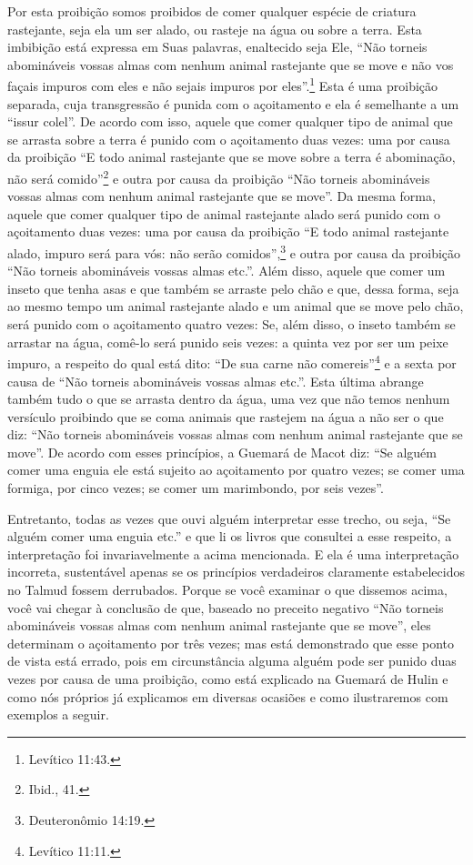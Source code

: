 Por esta proibição somos proibidos de comer qualquer espécie de
criatura rastejante, seja ela um ser alado, ou rasteje na água ou sobre
a terra.
Esta imbibição está expressa em Suas palavras, enaltecido seja Ele,
``Não torneis abomináveis vossas almas com nenhum animal rastejante que se move e
não vos façais impuros com eles e não sejais impuros por eles''.\footnote{Levítico
11:43.} Esta é uma proibição separada, cuja transgressão é punida com o
açoitamento e ela é semelhante a um ``issur colel''. De acordo com isso,
aquele que comer qualquer tipo de animal que se arrasta sobre a terra é punido com
o açoitamento duas vezes: uma por causa da proibição ``E todo animal
rastejante que se move sobre a terra é abominação, não será comido''\footnote{Ibid., 41.} e
outra por causa da proibição ``Não torneis abomináveis vossas almas com
nenhum animal rastejante que se move''. Da mesma forma, aquele que comer
qualquer tipo de animal rastejante alado será punido com o açoitamento duas
vezes: uma por causa da proibição ``E todo animal rastejante alado, impuro será
para vós: não serão comidos'',\footnote{Deuteronômio 14:19.} e outra por causa da proibição
``Não torneis abomináveis vossas almas etc.''. Além disso, aquele que comer um
inseto que tenha asas e que também se arraste pelo chão e que, dessa
forma, seja ao mesmo tempo um animal rastejante alado e um animal que se move pelo
chão, será punido com o açoitamento quatro vezes: Se, além disso, o
inseto também se arrastar na água, comê-lo será punido seis vezes: a quinta vez
por ser um peixe impuro, a respeito do qual está dito: ``De sua carne
não comereis''\footnote{Levítico 11:11.} e a sexta por causa de ``Não torneis
abomináveis vossas almas etc.''. Esta última abrange também tudo o que
se arrasta dentro da água, uma vez que não temos nenhum versículo
proibindo que se coma animais que rastejem na água a não ser o que diz:
``Não torneis abomináveis vossas almas com nenhum animal rastejante que
se move''. De acordo com esses princípios, a Guemará de Macot diz: ``Se
alguém comer uma enguia ele está sujeito ao açoitamento por quatro
vezes; se comer uma formiga, por cinco vezes; se comer um marimbondo,
por seis vezes''.

Entretanto, todas as vezes que ouvi alguém interpretar esse trecho, ou
seja, ``Se alguém comer uma enguia etc.'' e que li os livros que
consultei a esse respeito, a interpretação foi invariavelmente a acima
mencionada. E ela é uma interpretação incorreta, sustentável apenas se
os princípios verdadeiros claramente estabelecidos no Talmud fossem
derrubados. Porque se você examinar o que dissemos acima, você vai
chegar à conclusão de que, baseado no preceito negativo ``Não torneis
abomináveis vossas almas com nenhum animal rastejante que se move'',
eles determinam o açoitamento por três vezes; mas está demonstrado que
esse ponto de vista está errado, pois em circunstância alguma alguém
pode ser punido duas vezes por causa de uma proibição, como está
explicado na Guemará de Hulin e como nós próprios já explicamos em
diversas ocasiões e como ilustraremos com exemplos a seguir.

